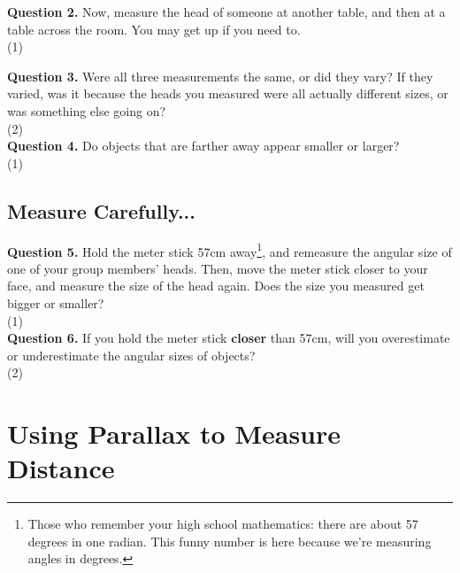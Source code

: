 \documentclass[11pt]{article}
\begin{document}
\textbf{Question 2.} Now, measure the head of someone at another table, and then at a table across the room. You may get up if you need to.\\

\vspace{1.5cm}
(1) \hrulefill

\newpage

\textbf{Question 3.} Were all three measurements the same, or did they vary? If they varied, was it because the heads you measured were all actually different sizes, or was something else going on?\\

\vspace{1.5cm}
(2) \hrulefill\\

\textbf{Question 4.} Do objects that are farther away appear smaller or larger?\\

\vspace{1.5cm}
(1) \hrulefill\\

\subsection{Measure Carefully...}

\textbf{Question 5.} Hold the meter stick 57cm away\footnote{Those who remember your high school mathematics: there are about 57 degrees in one radian. This funny number is here because we're measuring angles in degrees.}, and remeasure the angular size of one of your group members' heads. Then, move the meter stick closer to your face, and measure the size of the head again. Does the size you measured get bigger or smaller?\\ 

\vspace{1.5cm}
(1) \hrulefill\\

\textbf{Question 6.} If you hold the meter stick \textbf{closer} than 57cm, will you overestimate or underestimate the angular sizes of objects?\\

\vspace{1.5cm}
(2) \hrulefill

\newpage

\section{Using Parallax to Measure Distance}
\end{document}
